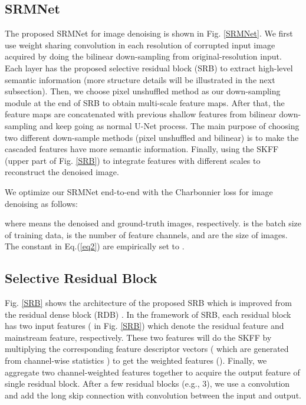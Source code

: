 \documentclass{article}
\begin{document}
\subsection{SRMNet}
The proposed SRMNet for image denoising is shown in Fig. \ref{SRMNet}. We first use  weight sharing convolution in each resolution of corrupted input image acquired by doing the bilinear down-sampling from original-resolution input. Each layer has the proposed selective residual block (SRB) to extract high-level semantic information (more structure details will be illustrated in the next subsection). Then, we choose pixel unshuffled method as our down-sampling module at the end of SRB to obtain multi-scale feature maps. After that, the feature maps are concatenated with previous shallow features from bilinear down-sampling and keep going as normal U-Net process. The main purpose of choosing two different down-sample methods (pixel unshuffled and bilinear) is to make the cascaded features have more semantic information. Finally, using the SKFF (upper part of Fig. \ref{SRB}) to integrate features with different scales to reconstruct the denoised image. 

We optimize our SRMNet end-to-end with the Charbonnier loss \cite{33} for image denoising as follows:
\newcommand{\Lagr}{\mathcal{L}} 

where  means the denoised and ground-truth images, respectively.  is the batch size of training data,  is the number of feature channels,  and  are the size of images. The constant  in Eq.(\ref{eq2}) are empirically set to .

\subsection{Selective Residual Block}
Fig. \ref{SRB} shows the architecture of the proposed SRB which is improved from the residual dense block (RDB) \cite{07}. In the framework of SRB, each residual block has two input features ( in Fig. \ref{SRB}) which denote the residual feature and mainstream feature, respectively. These two features will do the SKFF by multiplying the corresponding feature descriptor vectors ( which are generated from channel-wise statistics ) to get the weighted features (). Finally, we aggregate two channel-weighted features  together to acquire the output feature  of single residual block. After a few residual blocks (e.g., 3), we use a  convolution and add the long skip connection with  convolution between the input and output.
\end{document}
